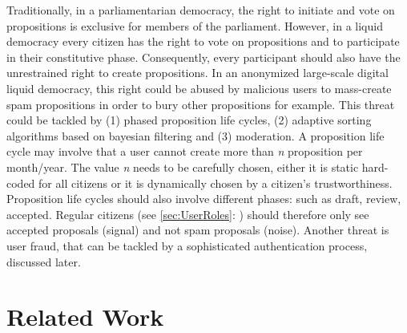 Traditionally, in a parliamentarian democracy, the right to initiate and vote on propositions is exclusive for members of the parliament.
However, in a liquid democracy every citizen has the right to vote on propositions and to participate in their constitutive phase. Consequently, every participant should also have the unrestrained right to create propositions. In an anonymized large-scale digital liquid democracy, this right could be abused by malicious users to mass-create spam propositions in order to bury other propositions for example. This threat could be tackled by (1) phased proposition life cycles, (2) adaptive sorting algorithms based on bayesian filtering and (3) moderation. A proposition life cycle may involve that a user cannot create more than \textit{n} proposition per month/year. The value \textit{n} needs to be carefully chosen, either it is static hard-coded for all citizens or it is dynamically chosen by a citizen’s trustworthiness. Proposition life cycles should also involve different phases: such as draft, review, accepted. Regular citizens (see \autoref{sec:UserRoles}: ) should therefore only see accepted proposals (signal) and not spam proposals (noise). Another threat is user fraud, that can be tackled by a sophisticated authentication process, discussed later.








\section{Related Work}
\label{sec:RelatedWork}
  
